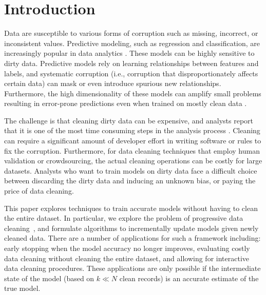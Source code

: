 \section{Introduction}
Data are susceptible to various forms of corruption such as missing, incorrect, or inconsistent values.
Predictive modeling, such as regression and classification, are increasingly popular in data analytics \cite{bdas, alexandrov2014stratosphere, crotty2014tupleware, hellerstein2012madlib}.
These models can be highly sensitive to dirty data.
Predictive models rely on learning relationships between features and labels, and systematic corruption \cite{taylor1982introduction} (i.e., corruption that disproportionately affects certain data) can mask or even introduce spurious new relationships.
Furthermore, the high dimensionality of these models can amplify small problems resulting in error-prone predictions even when trained on mostly clean data \cite{xiaofeature}.

The challenge is that cleaning dirty data can be expensive, and analysts report that it is one of the most time consuming steps in the analysis process \cite{nytimes}.
Cleaning can require a significant amount of developer effort in writing software or rules to fix the corruption.
Furthermore, for data cleaning techniques that employ human validation or crowdsourcing, the actual cleaning operations can be costly for large datasets.
Analysts who want to train models on dirty data face a difficult choice between discarding the dirty data and inducing an unknown bias, or paying the price of data cleaning.

This paper explores techniques to train accurate models without having to clean the entire dataset.
In particular, we explore the problem of progressive data cleaning~\cite{altowim2014progressive, whang2014incremental, papenbrock2015progressive, gruenheid2014incremental, mayfield2010eracer, DBLP:journals/pvldb/YakoutENOI11, yakout2013don}, and formulate algorithms to incrementally update models given newly cleaned data.
There are a number of applications for such a framework including: early stopping when the model accuracy no longer improves, evaluating costly data cleaning without cleaning the entire dataset, and allowing for interactive data cleaning procedures.
These applications are only possible if the intermediate state of the model (based on $k \ll N$ clean records) is an accurate estimate of the true model.

